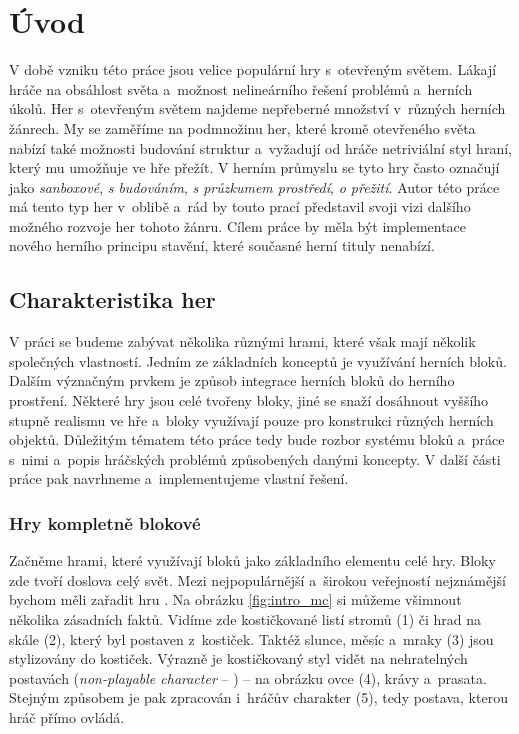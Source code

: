 
\chapter{Úvod}

V době vzniku této práce jsou velice populární hry s~otevřeným světem. Lákají hráče na obsáhlost světa a~možnost nelineárního řešení problémů a~herních úkolů. Her s~otevřeným světem najdeme nepřeberné množství v~různých herních žánrech. My se zaměříme na podmnožinu her, které kromě otevřeného světa nabízí také možnosti budování struktur a~vyžadují od hráče netriviální styl hraní, který mu umožňuje ve hře přežít. V herním průmyslu se tyto hry často označují jako \textit{sanboxové}, \textit{s budováním}, \textit{s průzkumem prostředí}, \textit{o přežití}. Autor této práce má tento typ her v~oblibě a~rád by touto prací představil svoji vizi dalšího možného rozvoje her tohoto žánru. Cílem práce by měla být implementace nového herního principu stavění, které současné herní tituly nenabízí.

\section{Charakteristika her}
V práci se budeme zabývat několika různými hrami, které však mají několik společných vlastností. Jedním ze základních konceptů je využívání herních bloků. Dalším význačným prvkem je způsob integrace herních bloků do herního prostření. Některé hry jsou celé tvořeny bloky, jiné se snaží dosáhnout vyššího stupně realismu ve hře a~bloky využívají pouze pro konstrukci různých herních objektů. Důležitým tématem této práce tedy bude rozbor systému bloků a~práce s~nimi a~popis hráčských problémů způsobených danými koncepty. V další části práce pak navrhneme a~implementujeme vlastní řešení.




\subsection{Hry kompletně blokové}
Začněme hrami, které využívají bloků jako základního elementu celé hry. Bloky zde tvoří doslova celý svět. Mezi nejpopulárnější a~širokou veřejností nejznámější bychom měli zařadit hru \MC{}. Na obrázku \ref{fig:intro_mc} si můžeme všimnout několika zásadních faktů. Vidíme zde kostičkované listí stromů (1) či hrad na skále (2), který byl postaven z~kostiček. Taktéž slunce, měsíc a~mraky (3) jsou stylizovány do kostiček. Výrazně je kostičkovaný styl vidět na nehratelných postavách (\textit{non-playable character} -- \NPC{}) -- na obrázku ovce (4), krávy a~prasata. Stejným způsobem je pak zpracován i~hráčův charakter (5), tedy postava, kterou hráč přímo ovládá.




